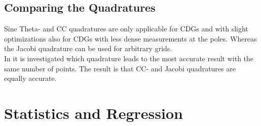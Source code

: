 \subsection{Comparing the Quadratures}

Sine Theta- and \ac{CC} quadratures are only applicable for \acp{CDG} and with slight optimizations also for \acp{CDG} with less dense measurements at the poles. Whereas the Jacobi quadrature can be used for arbitrary grids.\\
In \cite{trp2} it is investigated which quadrature leads to the most accurate result with the same number of points. The result is that \ac{CC}- and Jacobi quadratures are equally accurate.

\section{Statistics and Regression}